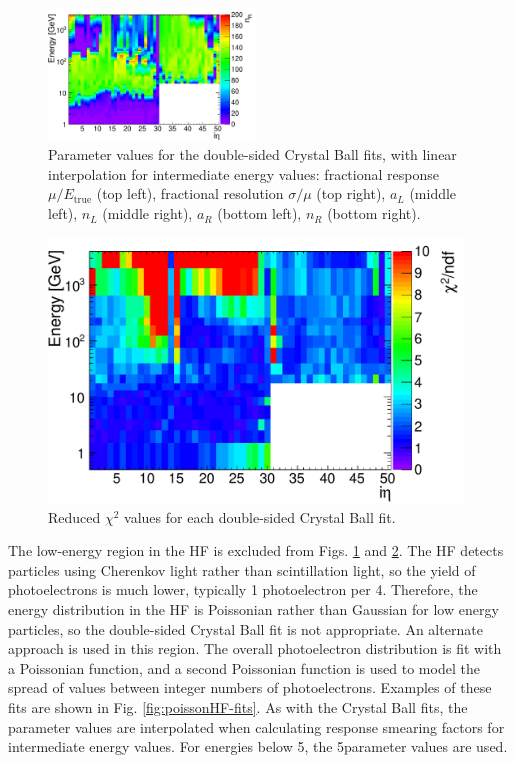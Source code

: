 \begin{figure}[hbtp]
\begin{center}
\includegraphics[width=0.49\textwidth]{figures/nR_tot_interp.pdf}
\caption{Parameter values for the double-sided Crystal Ball fits, with linear interpolation for intermediate energy values: fractional response $\mu/E_{\text{true}}$ (top left), fractional resolution $\sigma/\mu$ (top right), $a_{L}$ (middle left), $n_{L}$ (middle right), $a_{R}$ (bottom left), $n_{R}$ (bottom right).}
\label{fig:cballD-params}
\end{center}
\end{figure}

\begin{figure}[hbtp]
  \begin{center}
    \includegraphics[width=0.98\textwidth]{figures/chi2_tot.pdf}
    \caption{Reduced $\chi^{2}$ values for each double-sided Crystal Ball fit.}
    \label{fig:cballD-chi2}
  \end{center}
\end{figure}

The low-energy region in the HF is excluded from Figs. \ref{fig:cballD-params} and \ref{fig:cballD-chi2}. The HF detects particles using Cherenkov light rather than scintillation light, so the yield of photoelectrons is much lower, typically 1 photoelectron per 4\GeV. Therefore, the energy distribution in the HF is Poissonian rather than Gaussian for low energy particles, so the double-sided Crystal Ball fit is not appropriate. An alternate approach is used in this region. The overall photoelectron distribution is fit with a Poissonian function, and a second Poissonian function is used to model the spread of values between integer numbers of photoelectrons. Examples of these fits are shown in Fig. \ref{fig:poissonHF-fits}. As with the Crystal Ball fits, the parameter values are interpolated when calculating response smearing factors for intermediate energy values. For energies below 5\GeV, the 5\GeV parameter values are used.


